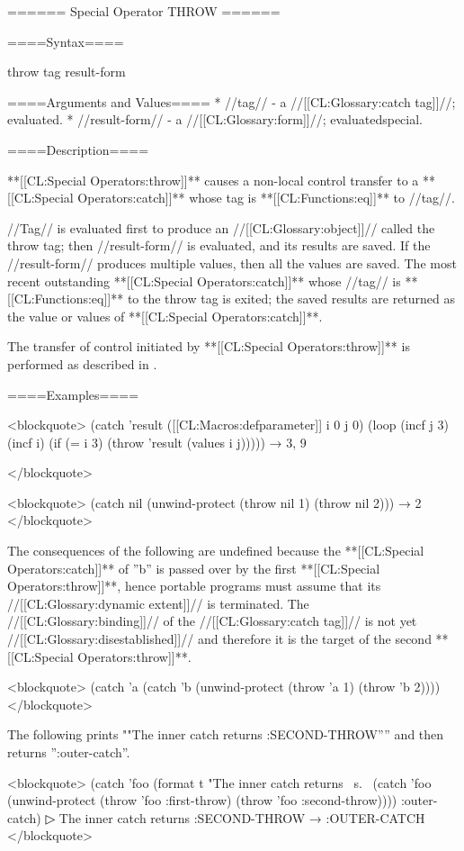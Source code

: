 ====== Special Operator THROW ======

====Syntax====

\DefspecNoReturn throw {tag result-form}

====Arguments and Values====
  * //tag// - a //[[CL:Glossary:catch tag]]//; evaluated.
  * //result-form// - a //[[CL:Glossary:form]]//; evaluatedspecial.

====Description====

**[[CL:Special Operators:throw]]** causes a non-local control transfer to a **[[CL:Special Operators:catch]]** whose tag is **[[CL:Functions:eq]]** to //tag//.

//Tag// is evaluated first to produce an //[[CL:Glossary:object]]// called the throw tag; then //result-form// is evaluated, and its results are saved. If the //result-form// produces multiple values, then all the values are saved. The most recent outstanding **[[CL:Special Operators:catch]]** whose //tag// is **[[CL:Functions:eq]]** to the throw tag is exited; the saved results are returned as the value or values of **[[CL:Special Operators:catch]]**.

The transfer of control initiated by **[[CL:Special Operators:throw]]** is performed as described in \secref\TransferOfControl.

====Examples====

<blockquote> (catch 'result ([[CL:Macros:defparameter]] i 0 j 0) (loop (incf j 3) (incf i) (if (= i 3) (throw 'result (values i j))))) → 3, 9

</blockquote>

<blockquote> (catch nil (unwind-protect (throw nil 1) (throw nil 2))) → 2 </blockquote>

The consequences of the following are undefined because the **[[CL:Special Operators:catch]]** of ''b'' is passed over by the first **[[CL:Special Operators:throw]]**, hence portable programs must assume that its //[[CL:Glossary:dynamic extent]]// is terminated. The //[[CL:Glossary:binding]]// of the //[[CL:Glossary:catch tag]]// is not yet //[[CL:Glossary:disestablished]]// and therefore it is the target of the second **[[CL:Special Operators:throw]]**.

<blockquote> (catch 'a (catch 'b (unwind-protect (throw 'a 1) (throw 'b 2)))) </blockquote>

The following prints ""The inner catch returns :SECOND-THROW'''' and then returns '':outer-catch''.

<blockquote> (catch 'foo (format t "The inner catch returns ~s.~ (catch 'foo (unwind-protect (throw 'foo :first-throw) (throw 'foo :second-throw)))) :outer-catch)
▷ The inner catch returns :SECOND-THROW → :OUTER-CATCH </blockquote>


